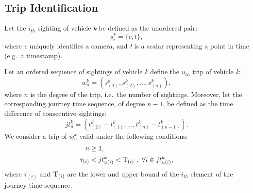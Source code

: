 \subsection{Trip Identification}\label{s.trips}

Let the $i_{th}$ sighting of vehicle \emph{k} be defined as the unordered pair:
\begin{equation} \label{e.sighting}
s^{k}_{i} = \{ c, t \},
\end{equation}
where \emph{c} uniquely identifies a camera, and \emph{t} is a scalar representing a point in time (e.g.\ a timestamp).

Let an ordered sequence of sightings of vehicle \emph{k} define the $u_{th}$ trip of vehicle \emph{k}:
\begin{equation} \label{e.trip}
w^{k}_{u} = \left(s^{k}_{(1)}, s^{k}_{(2)}, \dots , s^{k}_{(n)}\right),
\end{equation}
where \( n \) is the degree of the trip, i.e.\ the number of sightings. Moreover, let the corresponding journey time sequence, of degree \(n-1\), be defined as the time difference of consecutive sightings:
\begin{equation} \label{e.journeytime}
jt^{k}_{u} = \left(t^{k}_{(2)} - t^{k}_{(1)}, \ldots, t^{k}_{(n)} - t^{k}_{(n-1)} \right).
\end{equation}
We consider a trip of \emph{$w^k_u$} valid under the following conditions:
\begin{align}
n &\ge 1 , \label{e.trip.constraints.1} \\
\tau_{(i)} &< jt^{k}_{u(i)} < \mathrm{T}_{(i)} \ , \ \forall i \in jt^{k}_{u(i)} \label{e.trip.constraints.2},
\end{align}
where $\tau_{(i)}$ and $\mathrm{T}_{(i)}$ are the lower and upper bound of the $i_{th}$ element of the journey time sequence.

